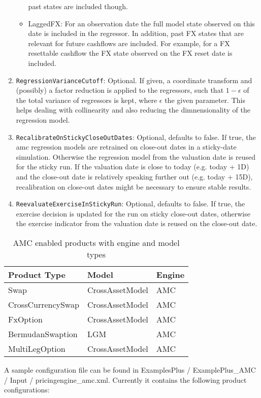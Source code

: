 \documentclass[12pt, a4paper]{article}
\begin{document}
\begin{enumerate}
\begin{itemize}
      past states are included though.
    \item LaggedFX: For an observation date the full model state observed on this date is included in the regressor. In
      addition, past FX states that are relevant for future cashflows are included. For example, for a FX resettable
      cashflow the FX state observed on the FX reset date is included.
  \end{itemize}
\item \verb+RegressionVarianceCutoff+: Optional. If given, a coordinate transform and (possibly) a factor reduction is
  applied to the regressors, such that $1-\epsilon$ of the total variance of regressors is kept, where $\epsilon$ the
  given parameter. This helps dealing with collinearity and also reducing the dimnensionality of the regression model.
\item \verb+RecalibrateOnStickyCloseOutDates+: Optional, defaults to false. If true, the amc regression models are
  retrained on close-out dates in a sticky-date simulation. Otherwise the regression model from the valuation date is
  reused for the sticky run. If the valuation date is close to today (e.g. today + 1D) and the close-out date is
  relatively speaking further out (e.g. today + 15D), recalibration on close-out dates might be necessary to ensure
  stable results.
\item \verb+ReevaluateExerciseInStickyRun+: Optional, defaults to false. If true, the exercise decision is updated for
  the run on sticky close-out dates, otherwise the exercise indicator from the valuation date is reused on the close-out
  date.
\end{enumerate}

\begin{table}[hbt]
  \begin{tabular}{l|l|l}
    Product Type & Model & Engine \\ \hline
    Swap & CrossAssetModel & AMC \\
    CrossCurrencySwap & CrossAssetModel & AMC \\
    FxOption & CrossAssetModel & AMC \\
    BermudanSwaption & LGM & AMC \\
    MultiLegOption & CrossAssetModel & AMC \\
  \end{tabular}
  \caption{AMC enabled products with engine and model types}
  \label{tbl:amcconfig}
\end{table}

A sample configuration file can be found in ExamplesPlus / ExamplePlus\_AMC / Input / pricingengine\_amc.xml. Currently it
contains the following product configurations:
\end{document}
